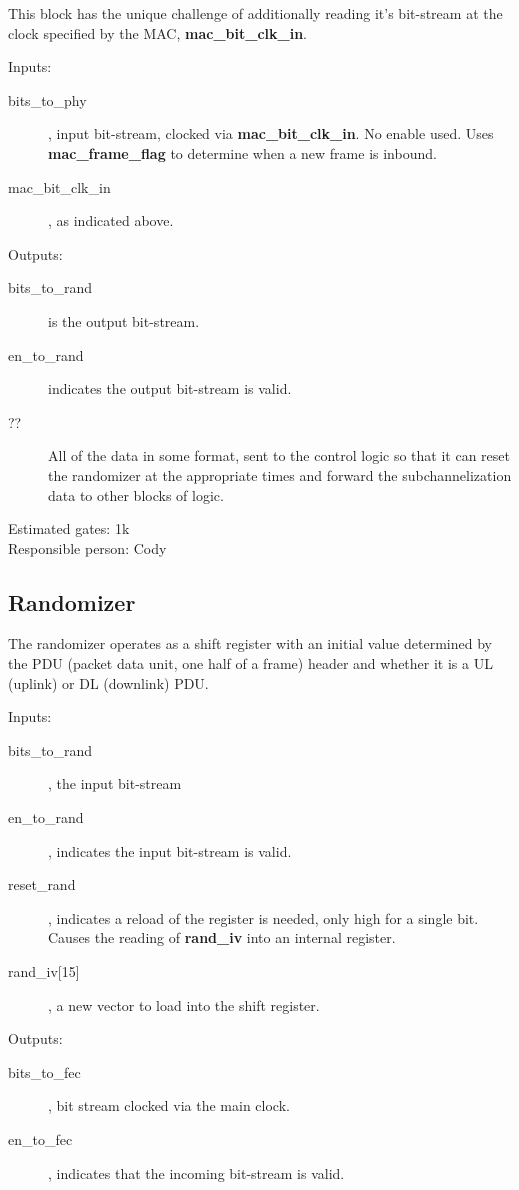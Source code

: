 \documentclass[dvips,10pt,twocolumn]{article}
\begin{document}
	This block has the unique challenge of additionally reading it's
	bit-stream at the clock specified by the MAC,
	\textbf{mac\_bit\_clk\_in}.

	\begin{description}
		\item{Inputs:} \begin{description}
			\item[bits\_to\_phy], input bit-stream,  clocked via
				\textbf{mac\_bit\_clk\_in}.  No enable
				used. Uses \textbf{mac\_frame\_flag} to
				determine when a new frame is inbound.
			\item[mac\_bit\_clk\_in], as indicated above.
		\end{description}
		\item{Outputs:} \begin{description}
			\item[bits\_to\_rand] is the output bit-stream.
			\item[en\_to\_rand] indicates the output bit-stream
				is valid.
			\item[??] All of the data in some format, sent to
				the control logic so that it can reset the
				randomizer at the appropriate times and
				forward the subchannelization data to other
				blocks of logic.
		\end{description}
	\end{description}

	Estimated gates: 1k \\
	Responsible person: Cody

	\subsection{Randomizer}
	\label{sec:rand}
	The randomizer operates as a shift register with an initial value
	determined by the PDU (packet data unit, one half of a frame) header
	and whether it is a UL (uplink) or DL (downlink) PDU.

	\begin{description}
		\item{Inputs:}
		\begin{description}
			\item[bits\_to\_rand], the input bit-stream
			\item[en\_to\_rand], indicates the input bit-stream
				is valid.
			\item[reset\_rand], indicates a reload of the
				register is needed, only high for a single
				bit. Causes the reading of \textbf{rand\_iv}
				into an internal register.
			\item[rand\_iv{[15]}], a new vector to load into
				the shift register.
		\end{description}
		\item{Outputs:}
		\begin{description}
			\item[bits\_to\_fec], bit stream clocked via the
				main clock.
			\item[en\_to\_fec], indicates that the incoming
				bit-stream is valid.
		\end{description}
	\end{description}
\end{document}
